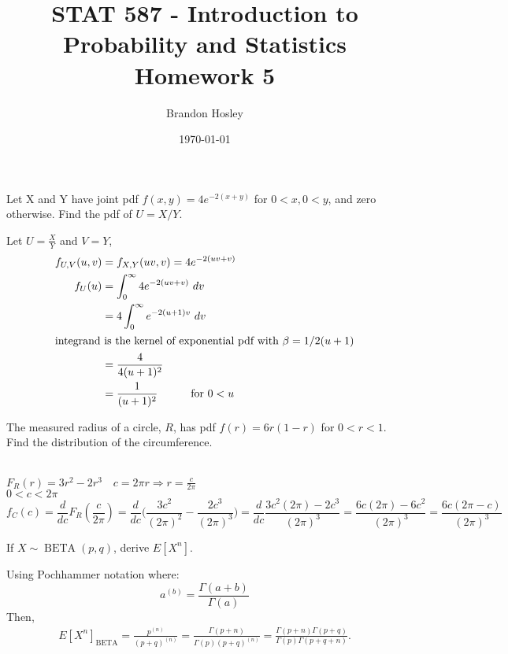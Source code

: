 \documentclass[answers]{exam}
\title{STAT 587 - Introduction to Probability and Statistics%
	\\ Homework 5}
\author{Brandon Hosley}
\date{\today}
\begin{document}
\maketitle
\begin{questions}

\question 
Let X and Y have joint pdf \(f(x,y)=4e^{-2(x+y)}\) for \(0<x,0<y\), and zero otherwise. 
Find the pdf of \(U=X/Y\).
\begin{solution}
	Let \(U = \frac{X}{Y}\) and \(V=Y\),
	\begin{align*}
		f_{U,V}(u,v) &= f_{X,Y}(uv,v) = 4e^{-2(uv+v)} \\
		f_U(u) &= \int_{0}^{\infty} 4e^{-2(uv+v)} \ dv \\
		&= 4 \int_{0}^{\infty} e^{-2(u+1)v} \ dv \\
		\intertext{integrand is the kernel of exponential pdf with $\beta=1/2(u+1)$} 
		&= \frac{4}{4(u+1)^2} \\
		&= \frac{1}{(u+1)^2} \hspace{3em}\text{for }0<u
	\end{align*}
\end{solution}

\question 
The measured radius of a circle, \(R\), has pdf \(f(r)=6r(1-r)\) for \(0<r<1\). 
Find the distribution of the circumference.
\begin{solution} \\
	\(F_R(r)=3r^2-2r^3 \quad c=2\pi r \Rightarrow r=\frac{c}{2\pi}\) \\ 
	\(0 < c < 2\pi\)
	\[f_C(c) 
	= \frac{d}{dc} F_R(\frac{c}{2\pi})
	= \frac{d}{dc} \bigg(\frac{3c^2}{(2\pi)^2}-\frac{2c^3}{(2\pi)^3} \bigg)
	= \frac{d}{dc} \frac{3c^2(2\pi)-2c^3}{(2\pi)^3}
	= \frac{6c(2\pi)-6c^2}{(2\pi)^3}
	= \frac{6c(2\pi-c)}{(2\pi)^3}
	\]
	
\end{solution}

\question 
If \(X \sim \operatorname{BETA}(p,q)\), derive \(E[X^n]\).
\begin{solution}
	Using Pochhammer notation where:
	\[ a^{(b)} = \frac{\Gamma(a+b)}{\Gamma(a)}\]
	Then,
	\begin{align*}
		E[X^n]_{\text{BETA}}
		= \frac{p^{(n)}}{(p+q)^{(n)}}
		= \frac{\Gamma(p+n)}{\Gamma(p)(p+q)^{(n)}}
		= \frac{\Gamma(p+n)\Gamma(p+q)}{\Gamma(p)\Gamma(p+q+n)}.
	\end{align*}
\end{solution}


\end{questions}
\end{document}

